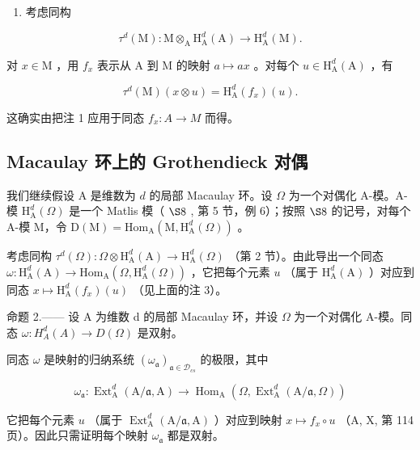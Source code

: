 \begin{enumerate}
\def\labelenumi{\arabic{enumi})}
\setcounter{enumi}{2}
\tightlist
\item
  考虑同构
\end{enumerate}

\[
\tau^ {d} (\mathrm{M}): \mathrm{M} \otimes_ {\mathrm{A}} \mathrm{H} _ {\mathrm{A}} ^ {d} (\mathrm{A}) \longrightarrow \mathrm{H} _ {\mathrm{A}} ^ {d} (\mathrm{M}).
\]

对 \(x \in \mathrm{M}\) ，用 \(f_x\) 表示从 A 到 M 的映射 \(a \mapsto ax\) 。对每个 \(u \in \mathrm{H}_{\mathrm{A}}^{d}(\mathrm{A})\) ，有

\[
\tau^ {d} (\mathrm{M}) (x \otimes u) = \mathrm{H} _ {\mathrm{A}} ^ {d} (f _ {x}) (u).
\]

这确实由把注 1 应用于同态 \(f_{x}:A\to M\) 而得。

\subsection{Macaulay 环上的 Grothendieck 对偶}

我们继续假设 A 是维数为 \(d\) 的局部 Macaulay 环。设 \(\Omega\) 为一个对偶化 A-模。A-模 \(\mathrm{H}_{\mathrm{A}}^{d}(\Omega)\) 是一个 Matlis 模（ \(\S 8\) , 第 5 节，例 6）；按照 \(\S 8\) 的记号，对每个 A-模 M，令 \(\mathrm{D(M)} = \mathrm{Hom}_{\mathrm{A}}(\mathrm{M}, \mathrm{H}_{\mathrm{A}}^{d}(\Omega))\) 。

考虑同构 \(\tau^{d}(\Omega):\Omega\otimes\mathrm{H}_{\mathrm{A}}^{d}(\mathrm{A})\to\mathrm{H}_{\mathrm{A}}^{d}(\Omega)\) （第 2 节）。由此导出一个同态 \(\omega:\mathrm{H}_{\mathrm{A}}^{d}(\mathrm{A})\to\mathrm{Hom}_{\mathrm{A}}(\Omega,\mathrm{H}_{\mathrm{A}}^{d}(\Omega))\) ，它把每个元素 \(u\) （属于 \(\mathrm{H}_{\mathrm{A}}^{d}(\mathrm{A})\) ）对应到同态 \(x\mapsto\mathrm{H}_{\mathrm{A}}^{d}(f_{x})(u)\) （见上面的注 3）。

命题 2.—— 设 A 为维数 d 的局部 Macaulay 环，并设 \(\Omega\) 为一个对偶化 A-模。同态 \(\omega: H_{A}^{d}(A) \to D(\Omega)\) 是双射。

同态 \(\omega\) 是映射的归纳系统 \((\omega_{\mathfrak{a}})_{\mathfrak{a}\in\mathcal{D}_{cs}}\) 的极限，其中

\[
\omega_ {\mathfrak {a}}: \operatorname{Ext} _ {\mathrm{A}} ^ {d} (\mathrm{A} / \mathfrak {a}, \mathrm{A}) \longrightarrow \operatorname{Hom} _ {\mathrm{A}} (\Omega , \operatorname{Ext} _ {\mathrm{A}} ^ {d} (\mathrm{A} / \mathfrak {a}, \Omega))
\]

它把每个元素 \(u\) （属于 \(\operatorname{Ext}_{\mathrm{A}}^{d}(\mathrm{A}/\mathfrak{a},\mathrm{A})\) ）对应到映射 \(x\mapsto f_{x}\circ u\) （A, X, 第 114 页）。因此只需证明每个映射 \(\omega_{\mathfrak{a}}\) 都是双射。

